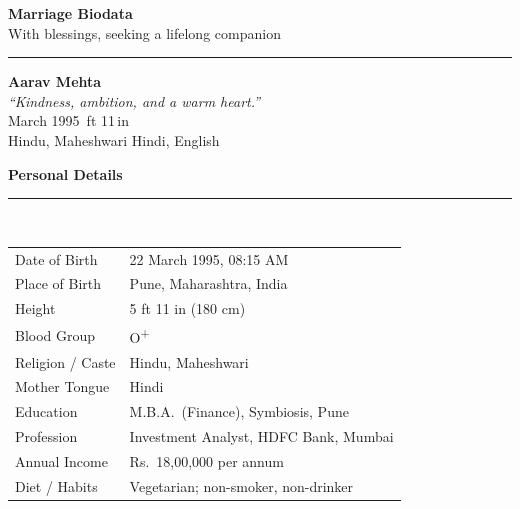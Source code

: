 \documentclass[a4paper,11pt]{article}
\newcommand{\biocard}[1]{%
  \vspace{6pt}%
  {\color{teal}\bfseries\large #1}\\[1pt]
  {\color{line}\rule{\linewidth}{1pt}}\\[3pt]%
}
\begin{document}
\thispagestyle{empty}

\begin{center}
  {\color{rose}\faHeart}\enspace
  {\color{teal}\fontsize{26}{30}\selectfont\bfseries Marriage Biodata}\enspace
  {\color{rose}\faHeart}\\[5pt]
  {\color{ink!55}\small With blessings, seeking a lifelong companion}\\[2pt]
  {\color{line}\rule{0.42\linewidth}{1.2pt}}
\end{center}

\vspace{4pt}

\noindent
\begin{minipage}[c]{0.66\linewidth}
  {\fontsize{22}{26}\selectfont\bfseries\color{ink}Aarav Mehta}\\[4pt]
  {\color{rose}\itshape ``Kindness, ambition, and a warm heart.''}\\[8pt]
  {\color{ink!70}\small
    \faBirthdayCake{} March 1995 \quad
    \faRulerVertical{}\,ft 11\,in \\[3pt]
    \faStar[regular]\enspace Hindu, Maheshwari \quad
    \faLanguage\enspace Hindi, English
  }
\end{minipage}%
\hfill
\begin{minipage}[c]{0.30\linewidth}
  \centering
\end{minipage}

\biocard{Personal Details}
\begin{tabularx}{\linewidth}{@{}K@{\hspace{8mm}}V@{}}
  Date of Birth   & 22 March 1995, 08:15 AM \\
  Place of Birth  & Pune, Maharashtra, India \\
  Height          & 5 ft 11 in (180 cm) \\
  Blood Group     & O\textsuperscript{+} \\
  Religion / Caste& Hindu, Maheshwari \\
  Mother Tongue   & Hindi \\
  Education       & M.B.A.\ (Finance), Symbiosis, Pune \\
  Profession      & Investment Analyst, HDFC Bank, Mumbai \\
  Annual Income   & Rs.\ 18,00,000 per annum \\
  Diet / Habits   & Vegetarian; non-smoker, non-drinker \\
\end{tabularx}
\end{document}

